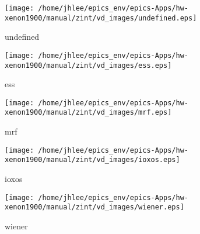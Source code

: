 \noindent
\vspace{1.4cm}
\begin{minipage}{.2\textwidth}
\begin{center}
\texttt{[image: /home/jhlee/epics\_env/epics-Apps/hw-xenon1900/manual/zint/vd\_images/undefined.eps]}
\end{center}
\end{minipage}
\begin{minipage}{.7\textwidth}
undefined
\end{minipage}


\noindent
\vspace{1.4cm}
\begin{minipage}{.2\textwidth}
\begin{center}
\texttt{[image: /home/jhlee/epics\_env/epics-Apps/hw-xenon1900/manual/zint/vd\_images/ess.eps]}
\end{center}
\end{minipage}
\begin{minipage}{.7\textwidth}
ess
\end{minipage}


\noindent
\vspace{1.4cm}
\begin{minipage}{.2\textwidth}
\begin{center}
\texttt{[image: /home/jhlee/epics\_env/epics-Apps/hw-xenon1900/manual/zint/vd\_images/mrf.eps]}
\end{center}
\end{minipage}
\begin{minipage}{.7\textwidth}
mrf
\end{minipage}


\noindent
\vspace{1.4cm}
\begin{minipage}{.2\textwidth}
\begin{center}
\texttt{[image: /home/jhlee/epics\_env/epics-Apps/hw-xenon1900/manual/zint/vd\_images/ioxos.eps]}
\end{center}
\end{minipage}
\begin{minipage}{.7\textwidth}
ioxos
\end{minipage}


\noindent
\vspace{1.4cm}
\begin{minipage}{.2\textwidth}
\begin{center}
\texttt{[image: /home/jhlee/epics\_env/epics-Apps/hw-xenon1900/manual/zint/vd\_images/wiener.eps]}
\end{center}
\end{minipage}
\begin{minipage}{.7\textwidth}
wiener
\end{minipage}


